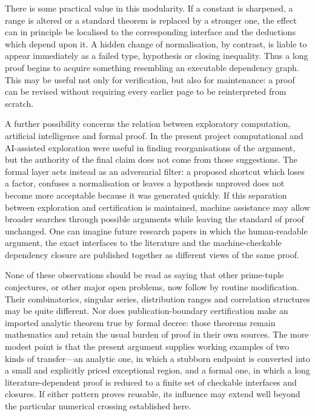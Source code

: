 \documentclass{aomart}
\theoremstyle{definition}
\newcommand{\1}{\mathbf 1}
\begin{document}
There is some practical value in this modularity.  If a constant is sharpened, a range is altered or a standard theorem is replaced by a stronger one, the effect can in principle be localised to the corresponding interface and the deductions which depend upon it.  A hidden change of normalisation, by contrast, is liable to appear immediately as a failed type, hypothesis or closing inequality.  Thus a long proof begins to acquire something resembling an executable dependency graph.  This may be useful not only for verification, but also for maintenance: a proof can be revised without requiring every earlier page to be reinterpreted from scratch.

A further possibility concerns the relation between exploratory computation, artificial intelligence and formal proof.  In the present project computational and AI-assisted exploration were useful in finding reorganisations of the argument, but the authority of the final claim does not come from those suggestions.  The formal layer acts instead as an adversarial filter: a proposed shortcut which loses a factor, confuses a normalisation or leaves a hypothesis unproved does not become more acceptable because it was generated quickly.  If this separation between exploration and certification is maintained, machine assistance may allow broader searches through possible arguments while leaving the standard of proof unchanged.  One can imagine future research papers in which the human-readable argument, the exact interfaces to the literature and the machine-checkable dependency closure are published together as different views of the same proof.

None of these observations should be read as saying that other prime-tuple conjectures, or other major open problems, now follow by routine modification.  Their combinatorics, singular series, distribution ranges and correlation structures may be quite different.  Nor does publication-boundary certification make an imported analytic theorem true by formal decree: those theorems remain mathematics and retain the usual burden of proof in their own sources.  The more modest point is that the present argument supplies working examples of two kinds of transfer---an analytic one, in which a stubborn endpoint is converted into a small and explicitly priced exceptional region, and a formal one, in which a long literature-dependent proof is reduced to a finite set of checkable interfaces and closures.  If either pattern proves reusable, its influence may extend well beyond the particular numerical crossing established here.
\end{document}
